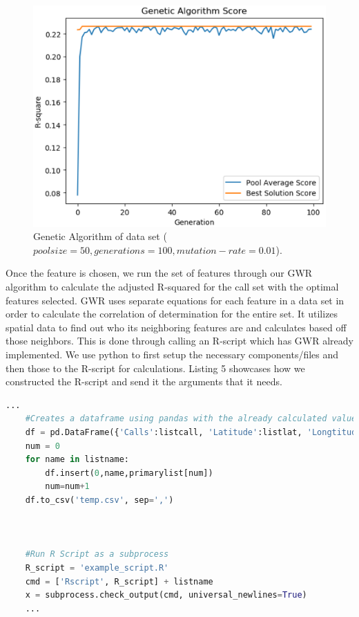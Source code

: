 \documentclass[onecolumn, draftclsnofoot,10pt, compsoc]{IEEEtran}
\begin{document}
\begin{singlespace}
\begin{figure}[h!]
    \centering
    \includegraphics[scale=0.5]{GA.eps}
    \caption{Genetic Algorithm of data set ($pool size = 50, generations = 100, mutation-rate = 0.01$).}
    \label{fig:GA}
\end{figure}

Once the feature is chosen, we run the set of features through our GWR algorithm to calculate the adjusted R-squared for the call set with the optimal features selected.
GWR uses separate equations for each feature in a data set in order to calculate the correlation of determination for the entire set.
It utilizes spatial data to find out who its neighboring features are and calculates based off those neighbors.
This is done through calling an R-script which has GWR already implemented.
We use python to first setup the necessary components/files and then those to the R-script for calculations.
Listing 5 showcases how we constructed the R-script and send it the arguments that it needs.

\begin{lstlisting}[language=Python, caption={Initial setup for GWR.}, label={lst:GWR}, captionpos=b]
    ...
    #Creates a dataframe using pandas with the already calculated values
    df = pd.DataFrame({'Calls':listcall, 'Latitude':listlat, 'Longtitude':listlong, 'x':xcords, 'y':ycords})
    num = 0
    for name in listname:
        df.insert(0,name,primarylist[num])
        num=num+1
    df.to_csv('temp.csv', sep=',')



    #Run R Script as a subprocess
    R_script = 'example_script.R'
    cmd = ['Rscript', R_script] + listname
    x = subprocess.check_output(cmd, universal_newlines=True)
    ...
\end{lstlisting}


\end{singlespace}
\end{document}
